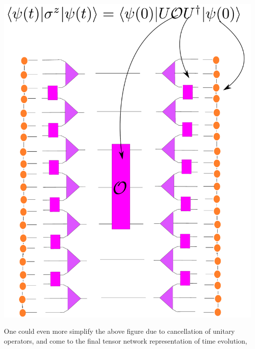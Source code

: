 \documentclass[aps,prb,onecolumn,groupedaddress,notitlepage,showpacs,floatfix,superscriptaddress]{revtex4-1}
\begin{document}
\begin{center}
\includegraphics[scale=0.2, angle=0, origin=c]{Final-equation-time}
\end{center}
One could even more simplify the above figure due to cancellation of unitary operators, and come to the final tensor network representation of time evolution,
\end{document}

